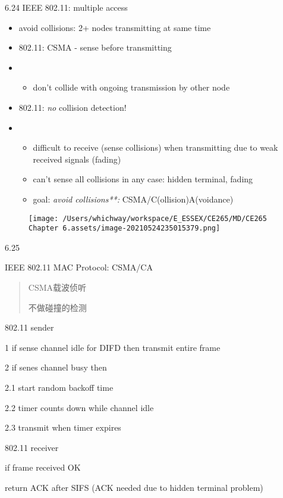 \documentclass[
]{article}
\begin{document}
6.24 IEEE 802.11: multiple access

\begin{itemize}
\item
  avoid collisions: 2+ nodes transmitting at same time
\item
  802.11: CSMA - sense before transmitting
\item
  \begin{itemize}
  \item
    don't collide with ongoing transmission by other node
  \end{itemize}
\item
  802.11: \emph{no} collision detection!
\item
  \begin{itemize}
  \item
    difficult to receive (sense collisions) when transmitting due to
    weak received signals (fading)
  \item
    can't sense all collisions in any case: hidden terminal, fading
  \item
    goal: \emph{avoid collisions**:} CSMA/C(ollision)A(voidance)
  \end{itemize}
\end{itemize}

\begin{figure}
\centering
\texttt{[image: /Users/whichway/workspace/E\_ESSEX/CE265/MD/CE265 Chapter 6.assets/image-20210524235015379.png]}
\caption{}
\end{figure}

6.25

IEEE 802.11 MAC Protocol: CSMA/CA

\begin{quote}
CSMA载波侦听

不做碰撞的检测
\end{quote}

802.11 sender

1 if sense channel idle for DIFD then transmit entire frame

2 if senes channel busy then

2.1 start random backoff time

2.2 timer counts down while channel idle

2.3 transmit when timer expires

802.11 receiver

if frame received OK

return ACK after SIFS (ACK needed due to hidden terminal problem)
\end{document}
